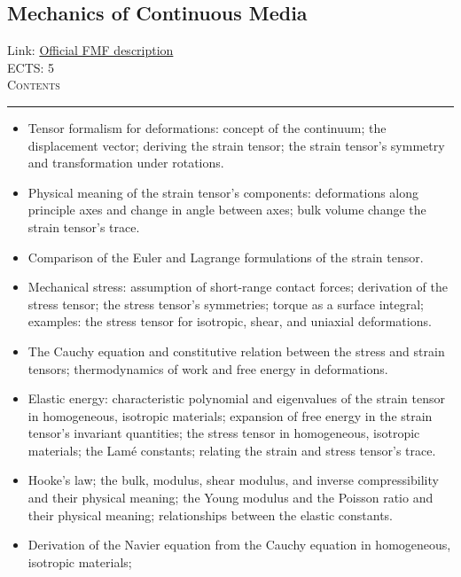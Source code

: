 \documentclass[11pt, a4paper]{article}
\newenvironment{course}[3]{
\subsection{#1}%
Link: \href{#2}{Official FMF description}\\%
ECTS: #3%
\vspace{1ex}
\\
{\large \textsc{Contents}}\\[-0.9ex]%
\rule{\textwidth}{0.5pt}
\vspace{-3ex}
}
{}
\newenvironment{chapter}[1]{
\begin{tcolorbox}[title=#1, breakable]
}
{\end{tcolorbox}}
\begin{document}
\begin{course}{Mechanics of Continuous Media}{https://www.fmf.uni-lj.si/en/study-physics/programmes/1fiz/2020/7000777/courses/1160/}{5}
    \label{mechanics_of_continuous_media}

    \begin{chapter}{Fundamentals of the theory of elasticity}
        \begin{itemize}
        
            \item Tensor formalism for deformations: concept of the continuum; the displacement vector; deriving the strain tensor; the strain tensor's symmetry and transformation under rotations.
            
            \item Physical meaning of the strain tensor's components: deformations along principle axes and change in angle between axes; bulk volume change the strain tensor's trace.
            
            \item Comparison of the Euler and Lagrange formulations of the strain tensor.

            \item Mechanical stress: assumption of short-range contact forces; derivation of the stress tensor; the stress tensor's symmetries; torque as a surface integral; examples: the stress tensor for isotropic, shear, and uniaxial deformations.
            
            \item The Cauchy equation and constitutive relation between the stress and strain tensors;
            thermodynamics of work and free energy in deformations.

            \item Elastic energy: characteristic polynomial and eigenvalues of the strain tensor in homogeneous, isotropic materials; expansion of free energy in the strain tensor's invariant quantities; the stress tensor in homogeneous, isotropic materials; the Lamé constants;
            relating the strain and stress tensor's trace.

            \item Hooke's law; the bulk, modulus, shear modulus, and inverse compressibility and their physical meaning;
            the Young modulus and the Poisson ratio and their physical meaning; relationships between the elastic constants.
            
            \item Derivation of the Navier equation from the Cauchy equation in homogeneous, isotropic materials;
            

\end{itemize}
\end{chapter}
\end{course}
\end{document}
